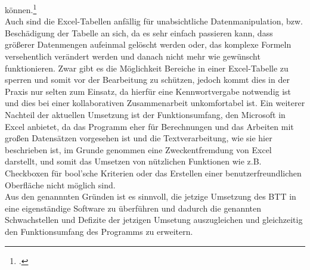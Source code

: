 können.\footcite[Vgl.][]{jemehrdesto}\\Auch sind die Excel-Tabellen anfällig für unabsichtliche Datenmanipulation, bzw. Beschädigung der Tabelle an sich, da es sehr einfach passieren kann, dass größerer Datenmengen aufeinmal gelöscht werden oder, das komplexe Formeln versehentlich verändert werden und danach nicht mehr wie gewünscht funktionieren. Zwar gibt es die Möglichkeit Bereiche in einer Excel-Tabelle zu sperren und somit vor der Bearbeitung zu schützen, jedoch kommt dies in der Praxis nur selten zum Einsatz, da hierfür eine Kennwortvergabe notwendig ist und dies bei einer kollaborativen Zusammenarbeit unkomfortabel ist. Ein weiterer Nachteil der aktuellen Umsetzung ist der Funktionsumfang, den Microsoft in Excel anbietet, da das Programm eher für Berechnungen und das Arbeiten mit großen Datensätzen vorgesehen ist und die Textverarbeitung, wie sie hier beschrieben ist, im Grunde genommen eine Zweckentfremdung von Excel darstellt, und somit das Umsetzen von nützlichen Funktionen wie z.B. Checkboxen für bool'sche Kriterien oder das Erstellen einer benutzerfreundlichen Oberfläche nicht möglich sind.\\ Aus den genannnten Gründen ist es sinnvoll, die jetzige Umsetzung des BTT in eine eigenständige Software zu überführen und dadurch die genannten Schwachstellen und Defizite der jetzigen Umsetung auszugleichen und gleichzeitig den Funktionsumfang des Programms zu erweitern.





